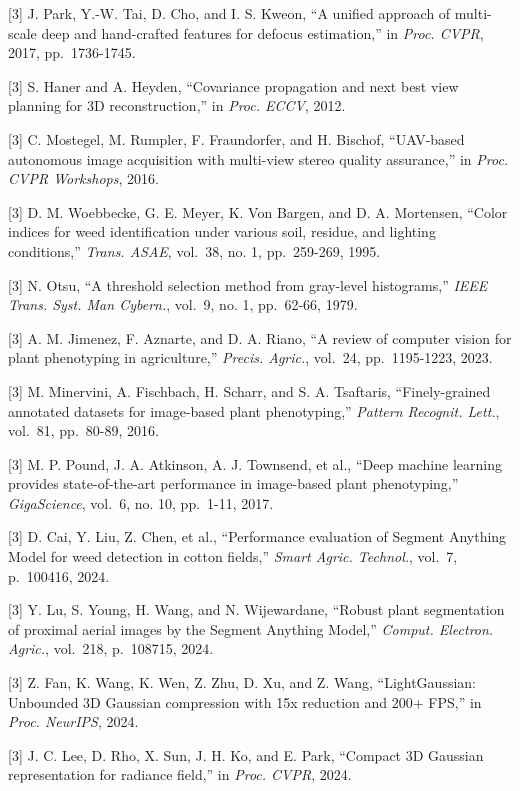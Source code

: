 \documentclass[11pt,a4paper]{article}
\begin{document}
{[}3{]} J. Park, Y.-W. Tai, D. Cho, and I. S. Kweon, ``A unified
approach of multi-scale deep and hand-crafted features for defocus
estimation,'' in \emph{Proc. CVPR}, 2017, pp.~1736-1745.

{[}3{]} S. Haner and A. Heyden, ``Covariance propagation and next best
view planning for 3D reconstruction,'' in \emph{Proc. ECCV}, 2012.

{[}3{]} C. Mostegel, M. Rumpler, F. Fraundorfer, and H. Bischof,
``UAV-based autonomous image acquisition with multi-view stereo quality
assurance,'' in \emph{Proc. CVPR Workshops}, 2016.

{[}3{]} D. M. Woebbecke, G. E. Meyer, K. Von Bargen, and D. A.
Mortensen, ``Color indices for weed identification under various soil,
residue, and lighting conditions,'' \emph{Trans. ASAE}, vol.~38, no. 1,
pp.~259-269, 1995.

{[}3{]} N. Otsu, ``A threshold selection method from gray-level
histograms,'' \emph{IEEE Trans. Syst. Man Cybern.}, vol.~9, no. 1,
pp.~62-66, 1979.

{[}3{]} A. M. Jimenez, F. Aznarte, and D. A. Riano, ``A review of
computer vision for plant phenotyping in agriculture,'' \emph{Precis.
Agric.}, vol.~24, pp.~1195-1223, 2023.

{[}3{]} M. Minervini, A. Fischbach, H. Scharr, and S. A. Tsaftaris,
``Finely-grained annotated datasets for image-based plant phenotyping,''
\emph{Pattern Recognit. Lett.}, vol.~81, pp.~80-89, 2016.

{[}3{]} M. P. Pound, J. A. Atkinson, A. J. Townsend, et al., ``Deep
machine learning provides state-of-the-art performance in image-based
plant phenotyping,'' \emph{GigaScience}, vol.~6, no. 10, pp.~1-11, 2017.

{[}3{]} D. Cai, Y. Liu, Z. Chen, et al., ``Performance evaluation of
Segment Anything Model for weed detection in cotton fields,''
\emph{Smart Agric. Technol.}, vol.~7, p.~100416, 2024.

{[}3{]} Y. Lu, S. Young, H. Wang, and N. Wijewardane, ``Robust plant
segmentation of proximal aerial images by the Segment Anything Model,''
\emph{Comput. Electron. Agric.}, vol.~218, p.~108715, 2024.

{[}3{]} Z. Fan, K. Wang, K. Wen, Z. Zhu, D. Xu, and Z. Wang,
``LightGaussian: Unbounded 3D Gaussian compression with 15x reduction
and 200+ FPS,'' in \emph{Proc. NeurIPS}, 2024.

{[}3{]} J. C. Lee, D. Rho, X. Sun, J. H. Ko, and E. Park, ``Compact 3D
Gaussian representation for radiance field,'' in \emph{Proc. CVPR},
2024.
\end{document}
